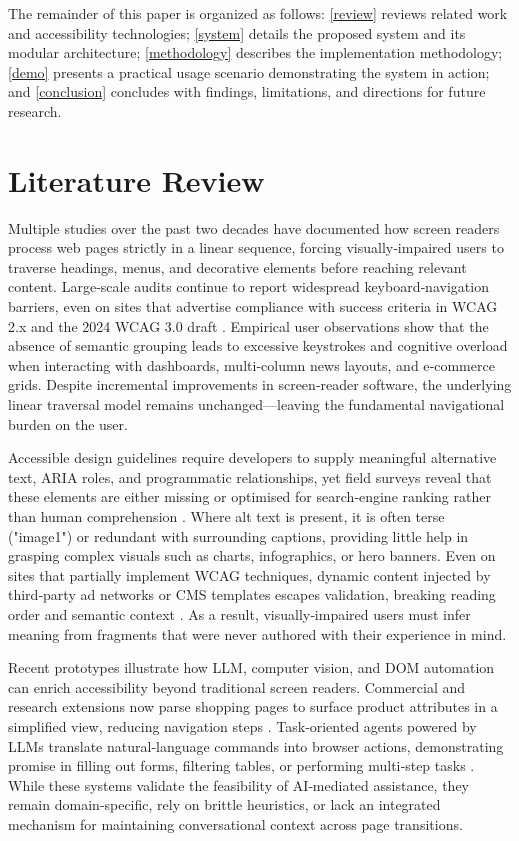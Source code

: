 \documentclass[conference]{IEEEtran}
\begin{document}
The remainder of this paper is organized as follows: \autoref{review} reviews related work and accessibility technologies; \autoref{system} details the proposed system and its modular architecture; \autoref{methodology} describes the implementation methodology; \autoref{demo} presents a practical usage scenario demonstrating the system in action; and \autoref{conclusion} concludes with findings, limitations, and directions for future research.


\section{Literature Review}\label{review}

Multiple studies over the past two decades have documented how screen readers process web pages strictly in a linear sequence, forcing visually‑impaired users to traverse headings, menus, and decorative elements before reaching relevant content. Large‑scale audits continue to report widespread keyboard‑navigation barriers, even on sites that advertise compliance with success criteria in WCAG 2.x and the 2024 WCAG 3.0 draft \cite{kerdar2024,wcagchallenges2025}. Empirical user observations show that the absence of semantic grouping leads to excessive keystrokes and cognitive overload when interacting with dashboards, multi‑column news layouts, and e‑commerce grids. Despite incremental improvements in screen‑reader software, the underlying linear traversal model remains unchanged—leaving the fundamental navigational burden on the user.

Accessible design guidelines require developers to supply meaningful alternative text, ARIA roles, and programmatic relationships, yet field surveys reveal that these elements are either missing or optimised for search‑engine ranking rather than human comprehension \cite{wcag2023}. Where alt text is present, it is often terse ("image1") or redundant with surrounding captions, providing little help in grasping complex visuals such as charts, infographics, or hero banners. Even on sites that partially implement WCAG techniques, dynamic content injected by third‑party ad networks or CMS templates escapes validation, breaking reading order and semantic context \cite{wcagchallenges2025}. As a result, visually‑impaired users must infer meaning from fragments that were never authored with their experience in mind.

Recent prototypes illustrate how LLM, computer vision, and DOM automation can enrich accessibility beyond traditional screen readers. Commercial and research extensions now parse shopping pages to surface product attributes in a simplified view, reducing navigation steps \cite{prakash2024}. Task‑oriented agents powered by LLMs translate natural‑language commands into browser actions, demonstrating promise in filling out forms, filtering tables, or performing multi‑step tasks \cite{kodandaram2024,mehendale2024}. While these systems validate the feasibility of AI‑mediated assistance, they remain domain‑specific, rely on brittle heuristics, or lack an integrated mechanism for maintaining conversational context across page transitions.
\end{document}
